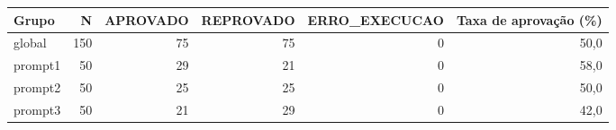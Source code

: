 \begin{tabular}{lrrrrr}
\toprule
Grupo & N & APROVADO & REPROVADO & ERRO\_EXECUCAO & Taxa de aprovação (\%) \\
\midrule
global & 150 & 75 & 75 & 0 & 50,0 \\
prompt1 & 50 & 29 & 21 & 0 & 58,0 \\
prompt2 & 50 & 25 & 25 & 0 & 50,0 \\
prompt3 & 50 & 21 & 29 & 0 & 42,0 \\
\bottomrule
\end{tabular}
